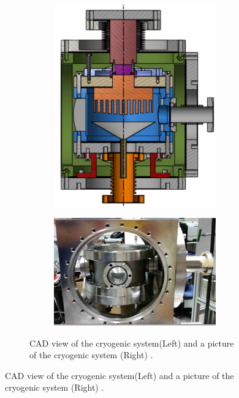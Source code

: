 \begin{figure}[h]
\begin{figure}
\centering
\begin{subfigure}[c]{0.25\textheight}
\includegraphics[width=\textwidth]{cryoMirror.png}
\end{subfigure}
\begin{subfigure}[c]{0.25\textheight}
\includegraphics[width=\textwidth]{cryoOpenCrop.png}
\end{subfigure}
\caption{ CAD view of the cryogenic system(Left) and a picture of the cryogenic system (Right) . 
\label{fig:cryo}}
\end{figure}


\end{figure}
